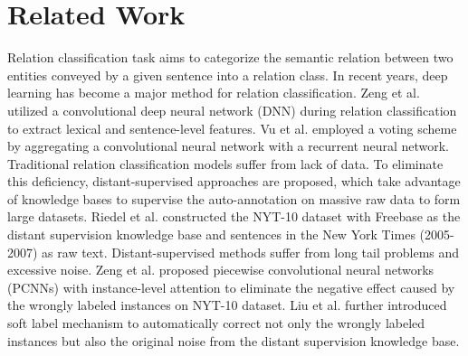 \section{Related Work}
Relation classification task aims to categorize the semantic relation between two entities conveyed by a given sentence into a relation class.
In recent years, deep learning has become a major method for relation classification.
Zeng et al.  utilized a convolutional deep neural network (DNN) during relation classification to extract lexical and sentence-level features. Vu et al.  employed a voting scheme by aggregating a convolutional neural network with a recurrent neural network.
%
Traditional relation classification models suffer from lack of data. To eliminate this deficiency, distant-supervised approaches are proposed, which take advantage of knowledge bases to supervise the auto-annotation on massive raw data to form large datasets. Riedel et al.  constructed the NYT-10 dataset with Freebase \cite{Freebase} as the distant supervision knowledge base and sentences in the New York Times (2005-2007) as raw text. Distant-supervised methods suffer from long tail problems and excessive noise. Zeng et al.  proposed piecewise convolutional neural networks (PCNNs) with instance-level attention to eliminate the negative effect caused by the wrongly labeled instances on NYT-10 dataset. Liu et al.  further introduced soft label mechanism to automatically correct not only the wrongly labeled instances but also the original noise from the distant supervision knowledge base.

